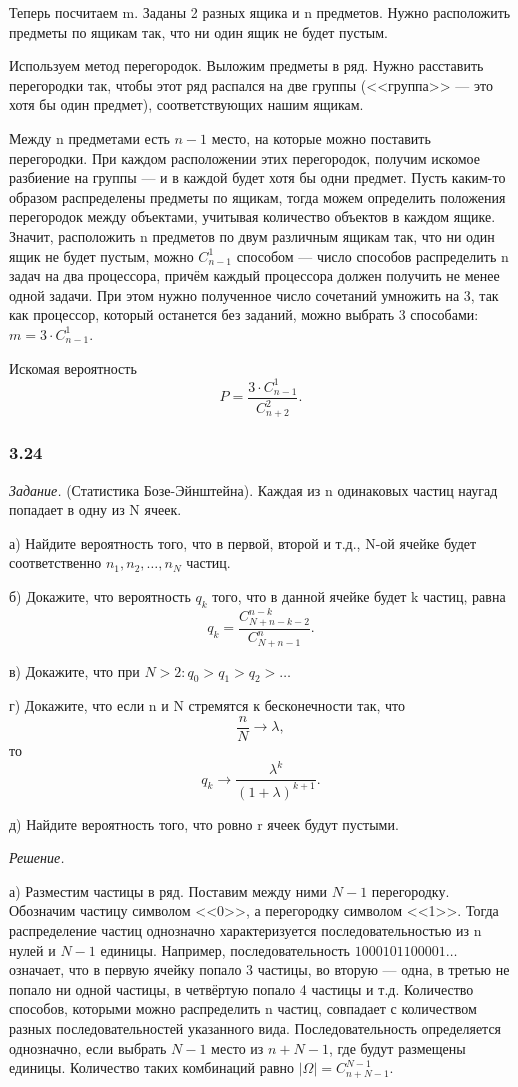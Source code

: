 \documentclass{book}
\begin{document}
Теперь посчитаем m.
Заданы 2 разных ящика и n предметов.
Нужно расположить предметы по ящикам так, что ни один ящик не будет пустым.

Используем метод перегородок.
Выложим предметы в ряд.
Нужно расставить перегородки так,
чтобы этот ряд распался на две группы (<<группа>> --- это хотя бы один предмет), соответствующих нашим ящикам.

Между n предметами есть $n-1$ место, на которые можно поставить перегородки.
При каждом расположении этих перегородок, получим искомое разбиение на группы --- и в каждой будет хотя бы одни предмет.
Пусть каким-то образом распределены предметы по ящикам, тогда можем определить положения перегородок между объектами,
учитывая количество объектов в каждом ящике.
Значит,
расположить n предметов по двум различным ящикам так,
что ни один ящик не будет пустым,
можно $ C_{n-1}^1 $ способом ---
число способов распределить n задач на два процессора,
причём каждый процессора должен получить не менее одной задачи.
При этом нужно полученное число сочетаний умножить на 3,
так как процессор, который останется без заданий, можно выбрать 3 способами: $ m = 3 \cdot C_{n-1}^1 $.

Искомая вероятность
$$ P =
\frac{ 3 \cdot C_{n-1}^1 }{ C_{n+2}^{2} }.$$

\subsubsection*{3.24}

\textit{Задание.} (Статистика Бозе-Эйнштейна).
Каждая из n одинаковых частиц наугад попадает в одну из N ячеек.

а) Найдите вероятность того, что в первой, второй и т.д., N-ой ячейке будет соответственно $ n_1, n_2, \dotsc , n_N $ частиц.

б) Докажите, что вероятность $ q_k $ того, что в данной ячейке будет k частиц, равна
$$ q_k =
\frac{ C_{ N+n-k-2 }^{ n-k } }{ C_{ N+n-1 }^n }.$$

в) Докажите, что при $ N > 2 : q_0 > q_1 > q_2 > \dotsc $

г) Докажите, что если n и N стремятся к бесконечности так, что
$$ \frac{ n }{ N } \rightarrow \lambda,$$
то
$$ q_k \rightarrow \frac{ \lambda^k }{ \left( 1 + \lambda \right)^{ k+1 } }.$$

д) Найдите вероятность того, что ровно r ячеек будут пустыми.

\textit{Решение.}

а) Разместим частицы в ряд.
Поставим между ними $ N - 1 $ перегородку.
Обозначим частицу символом <<0>>, а перегородку символом <<1>>.
Тогда распределение частиц однозначно характеризуется последовательностью из n нулей и $ N - 1 $ единицы.
Например, последовательность
$ 1000101100001 \dotsc $
означает, что в первую ячейку попало 3 частицы, во вторую --- одна, в третью не попало ни одной частицы, в четвёртую попало 4 частицы и т.д.
Количество способов, которыми можно распределить n частиц, совпадает с количеством разных последовательностей указанного вида.
Последовательность определяется однозначно, если выбрать $ N - 1 $ место из $ n + N - 1$, где будут размещены единицы.
Количество таких комбинаций равно $ | \Omega | = C_{n+N-1}^{N-1} $.
\end{document}
